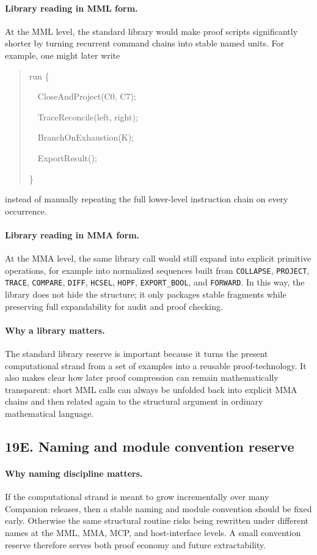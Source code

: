 \paragraph{Library reading in MML form.}
At the MML level, the standard library would make proof scripts significantly shorter by turning recurrent command chains into stable named units. For example, one might later write
\begin{quote}
\ttfamily
run \{\par
\ \ CloseAndProject(C0, C7);\par
\ \ TraceReconcile(left, right);\par
\ \ BranchOnExhaustion(K);\par
\ \ ExportResult();\par
\}\par
\end{quote}
instead of manually repeating the full lower-level instruction chain on every occurrence.

\paragraph{Library reading in MMA form.}
At the MMA level, the same library call would still expand into explicit primitive operations, for example into normalized sequences built from \texttt{COLLAPSE}, \texttt{PROJECT}, \texttt{TRACE}, \texttt{COMPARE}, \texttt{DIFF}, \texttt{HCSEL}, \texttt{HOPF}, \texttt{EXPORT\_BOOL}, and \texttt{FORWARD}. In this way, the library does not hide the structure; it only packages stable fragments while preserving full expandability for audit and proof checking.

\paragraph{Why a library matters.}
The standard library reserve is important because it turns the present computational strand from a set of examples into a reusable proof-technology. It also makes clear how later proof compression can remain mathematically transparent: short MML calls can always be unfolded back into explicit MMA chains and then related again to the structural argument in ordinary mathematical language.


\subsection*{19E. Naming and module convention reserve}

\paragraph{Why naming discipline matters.}
If the computational strand is meant to grow incrementally over many Companion releases, then a stable naming and module convention should be fixed early. Otherwise the same structural routine risks being rewritten under different names at the MML, MMA, MCP, and host-interface levels. A small convention reserve therefore serves both proof economy and future extractability.

